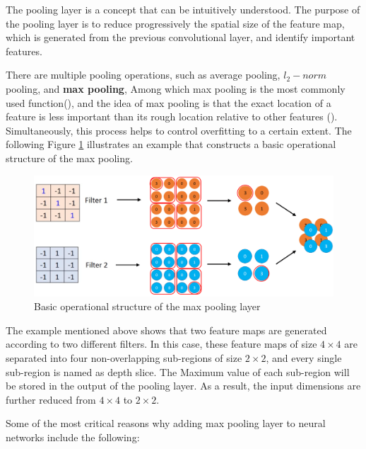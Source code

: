 \documentclass[]{krantz}
\begin{document}
The pooling layer is a concept that can be intuitively understood. The purpose of the pooling layer is to reduce progressively the spatial size of the feature map, which is generated from the previous convolutional layer, and identify important features.

There are multiple pooling operations, such as average pooling, \(l_{2}-norm\) pooling, and \textbf{max pooling}, Among which max pooling is the most commonly used function(\citet{Scherer2010EvaluationOP}), and the idea of max pooling is that the exact location of a feature is less important than its rough location relative to other features (\citet{Yamaguchi1990ANN}). Simultaneously, this process helps to control overfitting to a certain extent. The following Figure \ref{fig:figs-5} illustrates an example that constructs a basic operational structure of the max pooling.

\begin{figure}[ht]

{\centering \includegraphics[width=0.8\linewidth]{figures/01-03-cnns-and-their-applications-in-nlp/Max_Pooling_finish} 

}

\caption{Basic operational structure of the max pooling layer }\label{fig:figs-5}
\end{figure}

The example mentioned above shows that two feature maps are generated according to two different filters. In this case, these feature maps of size \(4\times4\) are separated into four non-overlapping sub-regions of size \(2\times2\), and every single sub-region is named as depth slice. The Maximum value of each sub-region will be stored in the output of the pooling layer. As a result, the input dimensions are further reduced from \(4\times4\) to \(2\times2\).

Some of the most critical reasons why adding max pooling layer to neural networks include the following:
\end{document}
